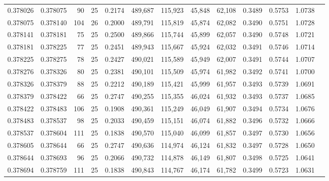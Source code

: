 \begin{tabular}{rrrrrrrrrrrrr}
0.378026 & 0.378075 &    90 &  25 &                                     0.2174 & 489,687 & 115,923 &  45,848 &  62,108 & 0.3489 & 0.5753 & 1.0738 \\
0.378075 & 0.378140 &   104 &  26 &                                     0.2000 & 489,791 & 115,819 &  45,874 &  62,082 & 0.3490 & 0.5751 & 1.0728 \\
0.378141 & 0.378181 &    75 &  25 &                                     0.2500 & 489,866 & 115,744 &  45,899 &  62,057 & 0.3490 & 0.5748 & 1.0721 \\
0.378181 & 0.378225 &    77 &  25 &                                     0.2451 & 489,943 & 115,667 &  45,924 &  62,032 & 0.3491 & 0.5746 & 1.0714 \\
0.378225 & 0.378275 &    78 &  25 &                                     0.2427 & 490,021 & 115,589 &  45,949 &  62,007 & 0.3491 & 0.5744 & 1.0707 \\
0.378276 & 0.378326 &    80 &  25 &                                     0.2381 & 490,101 & 115,509 &  45,974 &  61,982 & 0.3492 & 0.5741 & 1.0700 \\
0.378326 & 0.378379 &    88 &  25 &                                     0.2212 & 490,189 & 115,421 &  45,999 &  61,957 & 0.3493 & 0.5739 & 1.0691 \\
0.378379 & 0.378422 &    66 &  25 &                                     0.2747 & 490,255 & 115,355 &  46,024 &  61,932 & 0.3493 & 0.5737 & 1.0685 \\
0.378422 & 0.378483 &   106 &  25 &                                     0.1908 & 490,361 & 115,249 &  46,049 &  61,907 & 0.3494 & 0.5734 & 1.0676 \\
0.378483 & 0.378537 &    98 &  25 &                                     0.2033 & 490,459 & 115,151 &  46,074 &  61,882 & 0.3496 & 0.5732 & 1.0666 \\
0.378537 & 0.378604 &   111 &  25 &                                     0.1838 & 490,570 & 115,040 &  46,099 &  61,857 & 0.3497 & 0.5730 & 1.0656 \\
0.378605 & 0.378644 &    66 &  25 &                                     0.2747 & 490,636 & 114,974 &  46,124 &  61,832 & 0.3497 & 0.5728 & 1.0650 \\
0.378644 & 0.378693 &    96 &  25 &                                     0.2066 & 490,732 & 114,878 &  46,149 &  61,807 & 0.3498 & 0.5725 & 1.0641 \\
0.378694 & 0.378759 &   111 &  25 &                                     0.1838 & 490,843 & 114,767 &  46,174 &  61,782 & 0.3499 & 0.5723 & 1.0631 \\

\end{tabular}
